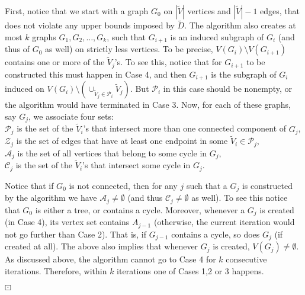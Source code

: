 \documentclass[12pt,a4paper]{article}
\theoremstyle{definition}
\theoremstyle{plain}
\newenvironment{prf}{\noindent {\bf Proof.}}{\begin{flushright}\vspace{-2em}\footnotesize$\boxdot$\normalsize\end{flushright}\smallskip}
\begin{document}
\begin{prf}
First, notice that we start with a graph $G_0$ 
on $|\widetilde{V}|$ vertices and $|\widetilde{V}|-1$ edges, 
that does not violate any upper bounds imposed by $\widetilde{D}$. 
The algorithm also creates at most $k$ graphs
$G_1,G_2,\ldots ,G_k$, 
such that $G_{i+1}$ is an induced subgraph of $G_i$ 
(and thus of $G_0$ as well) on strictly
less vertices. 
To be precise, $V(G_{i})\setminus V(G_{i+1})$ contains one or more of the 
$\widetilde{V}_j$'s. 
To see this, notice that for $G_{i+1}$ to be constructed 
this must happen in Case 4, 
and then $G_{i+1}$ is the subgraph of $G_i$ induced on 
$V(G_i)\setminus\left(\cup_{\widetilde{V}_j\in \mathcal P_i}\widetilde{V}_{j}\right)$. 
But $\mathcal P_i$ in this case should be nonempty,
or the algorithm would have terminated in Case 3.
Now, for each of these graphs, say $G_j$, we associate four sets: \\
$\mathcal P_j$ is the set of the $\widetilde V_i$'s that intersect 
more than one connected component of $G_j$, \\
$\mathcal Z_j$ is the set of edges that have at least one endpoint 
in some $\widetilde V_i\in \mathcal P_j$,\\
$\mathcal A_j$ is the set of all vertices that belong to some cycle in $G_j$,\\
$\mathcal C_j$ is the set of the $\widetilde V_i$'s 
that intersect some cycle in $G_j$.

Notice that if $G_0$ is not connected, then for any $j$ 
such that a $G_j$ is constructed by the algorithm
we have $\mathcal A_j\neq \emptyset$ 
(and thus $\mathcal C_j\neq \emptyset$ 
as well). 
To see this notice that $G_0$ is either a tree, or contains a cycle.
Moreover, whenever a $G_j$ is created (in Case 4),
its vertex set contains $A_{j-1}$ 
(otherwise, the current iteration would not go further than Case 2). 
That is, if $G_{j-1}$
contains a cycle, so does $G_j$ (if created at all). 
The above also implies that whenever $G_j$ is created, 
$V(G_j)\neq \emptyset$.
As discussed above, the algorithm cannot go to Case 4 for $k$ 
consecutive iterations.
Therefore, within $k$ iterations one of Cases 1,2 or 3 happens. 


\end{prf}
\end{document}
